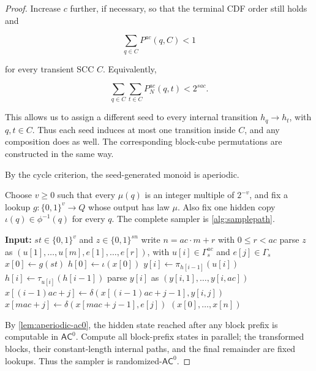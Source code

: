 \documentclass[10pt]{article}
\theoremstyle{definition}
\newcommand{\AC}{\mathsf{AC}}
\newcommand{\bits}{\{0,1\}}
\begin{document}
\begin{proof}
Increase $c$ further, if necessary, so that the terminal CDF order still holds
and

\begin{equation}
 \sum_{q\in C}P^{ac}(q,C)<1
\end{equation}

for every transient SCC $C$.  Equivalently,

\begin{equation}
 \sum_{q\in C}\sum_{t\in C}P_N^{ac}(q,t)<2^{sac}.
\end{equation}

This allows us to assign a different seed to every internal transition
$h_q\to h_t$, with $q,t\in C$.  Thus each seed induces at most one transition
inside $C$, and any composition does as well.  The corresponding block-cube
permutations are constructed in the same way.

By the cycle criterion, the seed-generated monoid is aperiodic.

Choose $v\ge0$ such that every $\mu(q)$ is an integer multiple of $2^{-v}$,
and fix a lookup $g:\bits^v\to Q$ whose output has law $\mu$.  Also fix one
hidden copy $\iota(q)\in\phi^{-1}(q)$ for every $q$.  The complete sampler is
\cref{alg:samplepath}.

\begin{algorithm}[ht]
\caption{SamplePath: sampling a transition-dyadic trajectory}
\label{alg:samplepath}
\begin{algorithmic}[1]
\State \textbf{Input:} $st\in\bits^v$ and $z\in\bits^{sn}$
\State write $n=ac\cdot m+r$ with $0\le r<ac$
\State parse $z$ as $(u[1],\ldots,u[m],e[1],\ldots,e[r])$, with
  $u[i]\in\Gamma_s^{ac}$ and $e[j]\in\Gamma_s$
\State $x[0]\gets g(st)$ 
\State $h[0]\gets\iota(x[0])$ 
  \State $y[i]\gets\pi_{h[i-1]}(u[i])$
  \State $h[i]\gets\tau_{u[i]}(h[i-1])$
  \State parse $y[i]$ as $(y[i,1],\ldots,y[i,ac])$
    \State $x[(i-1)ac+j]\gets\delta(x[(i-1)ac+j-1],y[i,j])$
  \EndFor
\EndFor
{}
  \State $x[mac+j]\gets\delta(x[mac+j-1],e[j])$
\EndFor
\State \Return $(x[0],\ldots,x[n])$
\end{algorithmic}
\end{algorithm}

By \cref{lem:aperiodic-ac0}, the hidden state reached after any block prefix
is computable in $\AC^0$.  Compute all block-prefix states in parallel; the
transformed blocks, their constant-length internal paths, and the final
remainder are fixed lookups.  Thus the sampler is randomized-$\AC^0$.
\end{proof}
\end{document}
